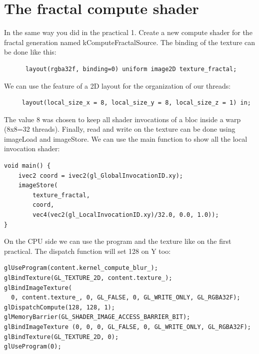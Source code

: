 \documentclass{article}
\begin{document}
\section{The fractal compute shader}
In the same way you did in the practical 1. Create a new compute shader for the fractal generation named kComputeFractalSource.
The binding of the texture can be done like this:
\begin{lstlisting}
	  layout(rgba32f, binding=0) uniform image2D texture_fractal;
\end{lstlisting}
We can use the feature of a 2D layout for the organization of our threads:
\begin{lstlisting}
	 layout(local_size_x = 8, local_size_y = 8, local_size_z = 1) in;
\end{lstlisting}
The value 8 was chosen to keep all shader invocations of a bloc inside a warp (8x8=32 threads). Finally, read and write on the texture can be done using imageLoad and imageStore. We can use the main function to show all the local invocation shader:
\begin{lstlisting}
void main() {
	ivec2 coord = ivec2(gl_GlobalInvocationID.xy);
	imageStore(
		texture_fractal,
		coord,
		vec4(vec2(gl_LocalInvocationID.xy)/32.0, 0.0, 1.0));
}
\end{lstlisting}
On the CPU side we can use the program and the texture like on the first practical. The dispatch function will set 128 on Y too:
\begin{lstlisting}
glUseProgram(content.kernel_compute_blur_);
glBindTexture(GL_TEXTURE_2D, content.texture_);
glBindImageTexture(
  0, content.texture_, 0, GL_FALSE, 0, GL_WRITE_ONLY, GL_RGBA32F);
glDispatchCompute(128, 128, 1);
glMemoryBarrier(GL_SHADER_IMAGE_ACCESS_BARRIER_BIT);
glBindImageTexture (0, 0, 0, GL_FALSE, 0, GL_WRITE_ONLY, GL_RGBA32F);
glBindTexture(GL_TEXTURE_2D, 0);
glUseProgram(0);
\end{lstlisting}
\end{document}
